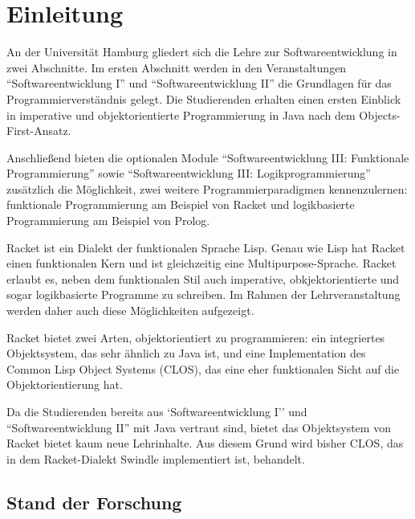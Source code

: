 \chapter{Einleitung} 

An der Universität Hamburg gliedert sich die Lehre zur Softwareentwicklung in zwei Abschnitte. Im ersten Abschnitt werden in den Veranstaltungen ``Softwareentwicklung I'' und ``Softwareentwicklung II'' die Grundlagen für das Programmierverständnis gelegt. Die Studierenden erhalten einen ersten Einblick in imperative und objektorientierte Programmierung in Java nach dem Objects-First-Ansatz.

Anschließend bieten die optionalen Module ``Softwareentwicklung III: Funktionale Programmierung'' sowie ``Softwareentwicklung III: Logikprogrammierung'' zusätzlich die Möglichkeit, zwei weitere  Programmierparadigmen kennenzulernen: funktionale Programmierung am Beispiel von Racket und logikbasierte Programmierung am Beispiel von Prolog.

Racket ist ein Dialekt der funktionalen Sprache Lisp. Genau wie Lisp hat Racket einen funktionalen Kern und ist gleichzeitig eine Mul\-ti\-pur\-pose-Spra\-che. Racket erlaubt es, neben dem funktionalen Stil auch imperative, obkjektorientierte und sogar logikbasierte Programme zu schreiben. Im Rahmen der Lehrveranstaltung werden daher auch diese Möglichkeiten aufgezeigt. 

Racket bietet zwei Arten, objektorientiert zu programmieren: ein integriertes Objektsystem, das sehr ähnlich zu Java ist, und eine Implementation des Common Lisp Object Systems (CLOS), das eine eher funktionalen Sicht auf die Objektorientierung hat. 

Da die Studierenden bereits aus `Softwareentwicklung I'' und ``Softwareentwicklung II'' mit Java vertraut sind, bietet das Objektsystem von Racket bietet kaum neue Lehrinhalte. Aus diesem Grund wird bisher CLOS, das in dem Racket-Dialekt Swindle implementiert ist, behandelt. 

\section{Stand der Forschung} 

